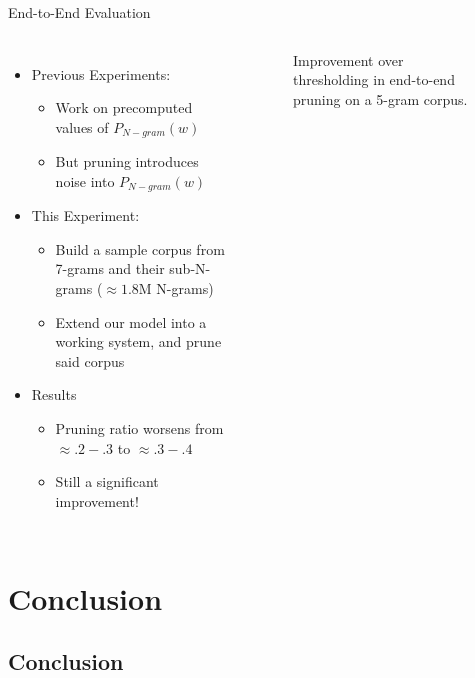 \documentclass[16:9,en,navbarinfooter]{sdqbeamer}
\begin{document}
\begin{frame}{End-to-End Evaluation}
    \begin{columns}
    \begin{itemize}
        \item Previous Experiments:
            \begin{itemize}
                \item Work on precomputed values of $P_{N-gram}(w)$
                \item But pruning introduces noise into $P_{N-gram}(w)$
            \end{itemize}
        \item This Experiment:
            \begin{itemize}
                \item Build a sample corpus from 7-grams and their sub-N-grams 
                    ($\approx 1.8$M N-grams)
                \item Extend our model into a working system, and prune said corpus
            \end{itemize}
        \item Results
                \begin{itemize}
                    \item Pruning ratio worsens from $\approx .2-.3$ to $\approx .3-.4$
                    \item Still a significant improvement!
                \end{itemize}
    \end{itemize}
        \begin{figure}
        
            \caption*{Improvement over thresholding in end-to-end pruning on a 5-gram corpus.}
        \end{figure}
    \end{columns}
\end{frame}

\section{Conclusion}
\subsection{Conclusion}
\end{document}
